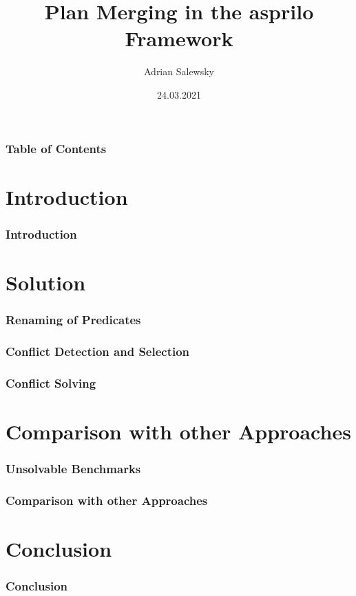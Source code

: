 \documentclass{beamer}
\title{Plan Merging in the asprilo Framework}
\author[Adrian Salewsky]{Adrian Salewsky}
\institute{University of Potsdam}
\date{24.03.2021}
\begin{document}
\frame{\titlepage}

\begin{frame}
\frametitle{Table of Contents}
\tableofcontents
\end{frame}

\section{Introduction} 
\begin{frame}
\frametitle{Introduction}
\end{frame}

\section{Solution}
\begin{frame}
\frametitle{Renaming of Predicates}
\end{frame}

\begin{frame}
\frametitle{Conflict Detection and Selection}
\end{frame}


\begin{frame}
\frametitle{Conflict Solving}
\end{frame}

\section{Comparison with other Approaches}
\begin{frame}
\frametitle{Unsolvable Benchmarks}
\end{frame}

\begin{frame}
\frametitle{Comparison with other Approaches}
\end{frame}

\section{Conclusion}
\begin{frame}
\frametitle{Conclusion}
\end{frame}
\end{document}
